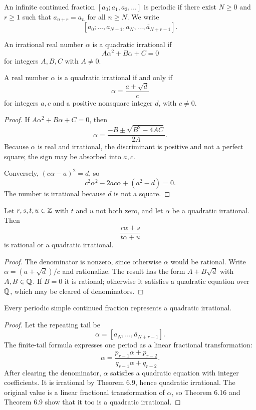 \begin{de}
An infinite continued fraction $[a_0;a_1,a_2,\ldots]$ is periodic if there exist $N\ge0$ and $r\ge1$ such that $a_{n+r}=a_n$ for all $n\ge N$.  We write
\[
 [a_0;\ldots,a_{N-1},\overbar{a_N,\ldots,a_{N+r-1}}].
\]
\end{de}

\begin{de}
An irrational real number $\alpha$ is a quadratic irrational if
\[
 A\alpha^2+B\alpha+C=0
\]
for integers $A,B,C$ with $A\ne0$.
\end{de}

\begin{thm}
A real number $\alpha$ is a quadratic irrational if and only if
\[
 \alpha=\frac{a+\sqrt d}{c}
\]
for integers $a,c$ and a positive nonsquare integer $d$, with $c\ne0$.
\end{thm}
\begin{proof}
If $A\alpha^2+B\alpha+C=0$, then
\[
 \alpha=\frac{-B\pm\sqrt{B^2-4AC}}{2A}.
\]
Because $\alpha$ is real and irrational, the discriminant is positive and not a perfect square; the sign may be absorbed into $a,c$.

Conversely, $(c\alpha-a)^2=d$, so
\[
 c^2\alpha^2-2ac\alpha+(a^2-d)=0.
\]
The number is irrational because $d$ is not a square.
\end{proof}

\begin{thm}
Let $r,s,t,u\in\mathbb{Z}$ with $t$ and $u$ not both zero, and let $\alpha$ be a quadratic irrational.  Then
\[
 \frac{r\alpha+s}{t\alpha+u}
\]
is rational or a quadratic irrational.
\end{thm}
\begin{proof}
The denominator is nonzero, since otherwise $\alpha$ would be rational.  Write $\alpha=(a+\sqrt d)/c$ and rationalize.  The result has the form $A+B\sqrt d$ with $A,B\in\mathbb{Q}$.  If $B=0$ it is rational; otherwise it satisfies a quadratic equation over $\mathbb{Q}$, which may be cleared of denominators.
\end{proof}

\begin{thm}
Every periodic simple continued fraction represents a quadratic irrational.
\end{thm}
\begin{proof}
Let the repeating tail be
\[
 \alpha=[\overbar{a_N,\ldots,a_{N+r-1}}].
\]
The finite-tail formula expresses one period as a linear fractional transformation:
\[
 \alpha=\frac{p_{r-1}\alpha+p_{r-2}}{q_{r-1}\alpha+q_{r-2}}.
\]
After clearing the denominator, $\alpha$ satisfies a quadratic equation with integer coefficients.  It is irrational by Theorem 6.9, hence quadratic irrational.  The original value is a linear fractional transformation of $\alpha$, so Theorem 6.16 and Theorem 6.9 show that it too is a quadratic irrational.
\end{proof}

